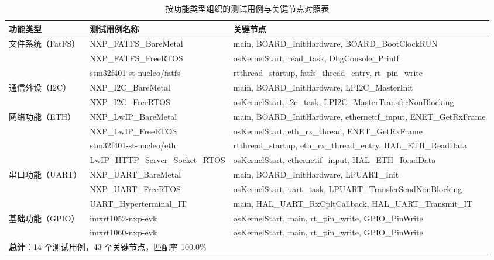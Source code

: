 \begin{table}[H]
\centering
\caption{按功能类型组织的测试用例与关键节点对照表}
\label{tab:testcases}
\footnotesize
\begin{adjustbox}{max width=\textwidth}
\begin{tabular}{lll}
\toprule
\textbf{功能类型} & \textbf{测试用例名称} & \textbf{关键节点} \\
\midrule
\multirow{3}{*}{文件系统（FatFS）} & NXP\_FATFS\_BareMetal & main, BOARD\_InitHardware, BOARD\_BootClockRUN \\
& NXP\_FATFS\_FreeRTOS & osKernelStart, read\_task, DbgConsole\_Printf \\
& stm32f401-st-nucleo/fatfs & rtthread\_startup, fatfs\_thread\_entry, rt\_pin\_write \\
\midrule
\multirow{2}{*}{通信外设（I2C）} & NXP\_I2C\_BareMetal & main, BOARD\_InitHardware, LPI2C\_MasterInit \\
& NXP\_I2C\_FreeRTOS & osKernelStart, i2c\_task, LPI2C\_MasterTransferNonBlocking \\
\midrule
\multirow{4}{*}{网络功能（ETH）} & NXP\_LwIP\_BareMetal & main, BOARD\_InitHardware, ethernetif\_input, ENET\_GetRxFrame \\
& NXP\_LwIP\_FreeRTOS & osKernelStart, eth\_rx\_thread, ENET\_GetRxFrame \\
& stm32f401-st-nucleo/eth & rtthread\_startup, eth\_rx\_thread\_entry, HAL\_ETH\_ReadData \\
& LwIP\_HTTP\_Server\_Socket\_RTOS & osKernelStart, ethernetif\_input, HAL\_ETH\_ReadData \\
\midrule
\multirow{3}{*}{串口功能（UART）} & NXP\_UART\_BareMetal & main, BOARD\_InitHardware, LPUART\_Init \\
& NXP\_UART\_FreeRTOS & osKernelStart, uart\_task, LPUART\_TransferSendNonBlocking \\
& UART\_Hyperterminal\_IT & main, HAL\_UART\_RxCpltCallback, HAL\_UART\_Transmit\_IT \\
\midrule
\multirow{2}{*}{基础功能（GPIO）} & imxrt1052-nxp-evk & osKernelStart, main, rt\_pin\_write, GPIO\_PinWrite \\
& imxrt1060-nxp-evk & osKernelStart, main, rt\_pin\_write, GPIO\_PinWrite \\
\midrule
\multicolumn{3}{l}{\textbf{总计}：14 个测试用例，43 个关键节点，匹配率 100.0\%} \\
\bottomrule
\end{tabular}
\end{adjustbox}
\end{table}

